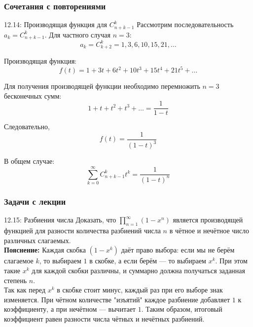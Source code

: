 \documentclass[a4paper,12pt]{article}
\begin{document}
	\subsubsection{Сочетания с повторениями}
	
	\begin{examplebox}{12.14: Производящая функция для \(C^k_{n+k-1}\)}
		Рассмотрим последовательность \(a_k = C^k_{n+k-1}\). Для частного случая \(n = 3\):
		\[ a_k = C^k_{k+2} = 1, 3, 6, 10, 15, 21, \dots \]
		
		Производящая функция:
		\[ f(t) = 1 + 3t + 6t^2 + 10t^3 + 15t^4 + 21t^5 + \dots \]
		
		Для получения производящей функции необходимо перемножить \(n = 3\) бесконечных сумм:
		\[ 1 + t + t^2 + t^3 + \dots = \frac{1}{1-t} \]
		
		Следовательно,
		\[ f(t) = \frac{1}{(1-t)^3} \]
		
		В общем случае:
		\[ \sum_{k=0}^\infty C^k_{n+k-1} t^k = \frac{1}{(1-t)^n} \]
	\end{examplebox}
	
	\subsubsection{Задачи с лекции}
	
	\begin{examplebox}{12.15: Разбиения числа}
		Доказать, что \(\displaystyle \prod_{n=1}^\infty (1 - x^n)\) является производящей функцией для разности количества разбиений числа \(n\) в чётное и нечётное число различных слагаемых.\\
		
		\textbf{Пояснение:} Каждая скобка \((1 - x^k)\) даёт право выбора: если мы не берём слагаемое \(k\), то выбираем \(1\) в скобке, а если берём — то выбираем \(x^k\). При этом такие \(x^k\) для каждой скобки различны, и суммарно должна получаться заданная степень \(n\).\\
		
		Так как перед \(x^k\) в скобке стоит минус, каждый раз при его выборе знак изменяется. При чётном количестве "изъятий" каждое разбиение добавляет \(1\) к коэффициенту, а при нечётном — вычитает \(1\). Таким образом, итоговый коэффициент равен разности числа чётных и нечётных разбиений.
	\end{examplebox}
	
\end{document}
